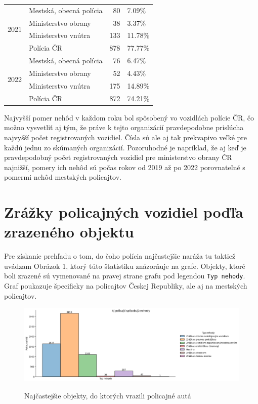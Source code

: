 \documentclass{article}
\begin{document}
\begin{table}[htb]
\begin{center}
\begin{tabular}{llrl}
\cline{1-4}
\multirow[t]{4}{*}{2021} & Mestská, obecná polícia & 80 & 7.09\% \\
 & Ministerstvo obrany & 38 & 3.37\% \\
 & Ministerstvo vnútra & 133 & 11.78\% \\
 & Polícia ČR & 878 & 77.77\% \\
\cline{1-4}
\multirow[t]{4}{*}{2022} & Mestská, obecná polícia & 76 & 6.47\% \\
 & Ministerstvo obrany & 52 & 4.43\% \\
 & Ministerstvo vnútra & 175 & 14.89\% \\
 & Polícia ČR & 872 & 74.21\% \\
\cline{1-4}
\bottomrule
\end{tabular}\label{tab:table2}
\end{center}
\end{table}

Najvyšší pomer nehôd v každom roku bol spôsobený vo vozidlách polície ČR, čo možno vysvetliť aj tým, že práve k tejto
organizácií pravdepodobne prislúcha najvyšší počet registrovaných vozidiel.
Čísla sú ale aj tak prekvapivo veľké pre každú jednu zo skúmaných organizácií.
Pozoruhodné je napríklad, že aj keď je pravdepodobný počet registrovaných vozidiel pre ministerstvo obrany ČR najnižší,
pomery ich nehôd sú počas rokov od 2019 až po 2022 porovnateľné s pomermi nehôd mestských policajtov.

\pagebreak

\section{Zrážky policajných vozidiel poďľa zrazeného objektu}\label{sec:zrazky-policajnych-vozidiel-podla-zrazeneho-objektu}

Pre získanie prehľadu o tom, do čoho polícia najčastejšie naráža tu taktiež uvádzam Obrázok 1,
ktorý túto štatistiku znázorňuje na grafe.
Objekty, ktoré boli zrazené sú vymenované na pravej strane grafu pod legendou \texttt{Typ nehody}.
Graf poukazuje špecificky na policajtov Českej Republiky, ale aj na mestských policajtov.

\begin{figure}[htb]
 \caption{Najčastejšie objekty, do ktorých vrazili policajné autá}
 \includegraphics[scale=0.5]{fig}\label{fig:figure1}
\end{figure}
\end{document}
